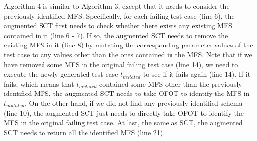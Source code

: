 \documentclass[10pt,journal,compsoc]{IEEEtran}
\begin{document}
Algorithm 4 is similar to Algorithm 3, except that it needs to consider the previously identified MFS. Specifically, for each failing test case (line 6), the augmented SCT first needs to  check whether there exists any existing MFS contained in it (line 6 - 7). If so, the augmented SCT needs to remove the existing MFS in it (line 8) by mutating the corresponding parameter values of the test case to any values other than the ones contained in the MFS. Note that if we have removed some MFS in the original failing test case (line 14), we need to execute the newly generated test case $t_{mutated}$ to see if it fails again (line 14). If it fails, which means that $t_{mutated}$ contained some MFS other than the previously identified MFS, the augmented SCT needs to take OFOT to identify the MFS in $t_{mutated}$. On the other hand, if we did not find any previously identified schema (line 10), the augmented SCT just needs to directly take OFOT to identify the MFS in the original failing test case. At last, the same as SCT, the augmented SCT needs to return all the identified MFS (line 21).
\end{document}
